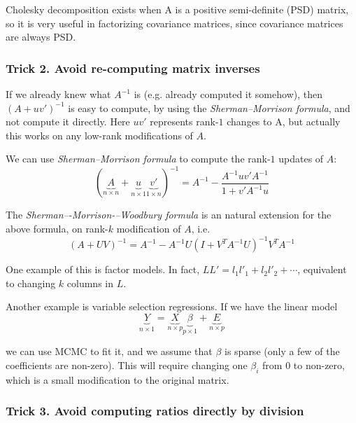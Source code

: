 \documentclass[12pt]{report}
\begin{document}
\vskip 0.1in

Cholesky decomposition exists when A is a positive semi-definite (PSD) matrix, so it is very useful in factorizing covariance matrices, since covariance matrices are always PSD.

\subsubsection{Trick 2. Avoid re-computing matrix inverses}

If we already knew what $A^{-1}$ is (e.g. already computed it somehow), then $(A+uv')^{-1}$ is easy to compute, by using the \textit{Sherman--Morrison formula}, and not compute it directly. Here $uv'$ represents rank-$1$ changes to A, but actually this works on any low-rank modifications of $A$.

We can use \textit{Sherman--Morrison formula} to compute the rank-$1$ updates of $A$:
\begin{equation}
	(\underbrace{A}_{n \times n} + \underbrace{u}_{n \times 1}\underbrace{v'}_{1 \times n})^{-1} = A^{-1} - \frac{A^{-1} uv' A^{-1}}{1 + v' A^{-1} u}
\end{equation}

The \emph{Sherman–-Morrison-–Woodbury formula} is an natural extension for the above formula, on rank-$k$ modification of $A$, i.e.
\begin{equation}
	(A+UV)^{-1} = A^{-1} - A^{-1} U (I + V^{T} A^{-1} U)^{-1} V^{T} A^{-1}
\end{equation}

One example of this is factor models. In fact, $LL' = l_1 l'_1 + l_2 l'_2 + \cdots$, equivalent to changing $k$ columns in $L$.

Another example is variable selection regressions. If we have the linear model
\begin{equation}
	\underbrace{Y}_{n \times 1} = \underbrace{X}_{n \times p} \underbrace{\beta}_{p \times 1} + \underbrace{E}_{n \times p}
\end{equation}

we can use MCMC to fit it, and we assume that $\beta$ is sparse (only a few of the coefficients are non-zero). This will require changing one $\beta_i$ from $0$ to non-zero, which is a small modification to the original matrix.

\subsubsection{Trick 3. Avoid computing ratios directly by division}
\end{document}
